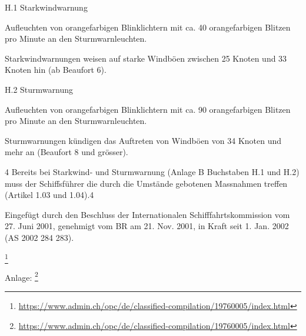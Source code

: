 H.1 Starkwindwarnung

Aufleuchten von orangefarbigen Blinklichtern mit ca. 40 orangefarbigen Blitzen pro Minute an den Sturmwarnleuchten.

Starkwindwarnungen weisen auf starke Windböen zwischen 25 Knoten und 33 Knoten hin (ab Beaufort 6).

H.2 Sturmwarnung

Aufleuchten von orangefarbigen Blinklichtern mit ca. 90 orangefarbigen Blitzen pro Minute an den Sturmwarnleuchten.

Sturmwarnungen kündigen das Auftreten von Windböen von 34 Knoten und mehr an (Beaufort 8 und grösser).


4 Bereits bei Starkwind- und Sturmwarnung (Anlage B Buchstaben H.1 und H.2) muss der Schiffsführer die durch die Umstände gebotenen Massnahmen treffen (Artikel 1.03 und 1.04).4

Eingefügt durch den Beschluss der Internationalen Schifffahrtskommission vom 27. Juni 2001, genehmigt vom BR am 21. Nov. 2001, in Kraft seit 1. Jan. 2002 (AS 2002 284 283).

\footnote{ \url{https://www.admin.ch/opc/de/classified-compilation/19760005/index.html}}


Anlage: 
\footnote{ \url{https://www.admin.ch/opc/de/classified-compilation/19760005/index.html}}



